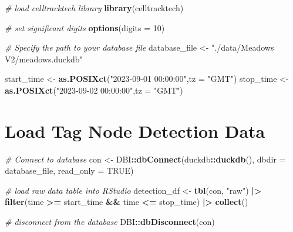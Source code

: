 \documentclass[
]{book}
\newenvironment{Shaded}{\begin{snugshade}}{\end{snugshade}}
\newcommand{\AttributeTok}[1]{\textcolor[rgb]{0.13,0.29,0.53}{#1}}
\newcommand{\CommentTok}[1]{\textcolor[rgb]{0.56,0.35,0.01}{\textit{#1}}}
\newcommand{\ConstantTok}[1]{\textcolor[rgb]{0.56,0.35,0.01}{#1}}
\newcommand{\DecValTok}[1]{\textcolor[rgb]{0.00,0.00,0.81}{#1}}
\newcommand{\FunctionTok}[1]{\textcolor[rgb]{0.13,0.29,0.53}{\textbf{#1}}}
\newcommand{\NormalTok}[1]{#1}
\newcommand{\OtherTok}[1]{\textcolor[rgb]{0.56,0.35,0.01}{#1}}
\newcommand{\SpecialCharTok}[1]{\textcolor[rgb]{0.81,0.36,0.00}{\textbf{#1}}}
\newcommand{\StringTok}[1]{\textcolor[rgb]{0.31,0.60,0.02}{#1}}
\begin{document}
\begin{Shaded}
\begin{Highlighting}[]
\CommentTok{\# load celltracktech library}
\FunctionTok{library}\NormalTok{(celltracktech)}

\CommentTok{\# set significant digits}
\FunctionTok{options}\NormalTok{(}\AttributeTok{digits =} \DecValTok{10}\NormalTok{)}

\CommentTok{\# Specify the path to your database file}
\NormalTok{database\_file }\OtherTok{\textless{}{-}} \StringTok{"./data/Meadows V2/meadows.duckdb"}

\NormalTok{start\_time }\OtherTok{\textless{}{-}} \FunctionTok{as.POSIXct}\NormalTok{(}\StringTok{"2023{-}09{-}01 00:00:00"}\NormalTok{,}\AttributeTok{tz =} \StringTok{"GMT"}\NormalTok{)}
\NormalTok{stop\_time }\OtherTok{\textless{}{-}} \FunctionTok{as.POSIXct}\NormalTok{(}\StringTok{"2023{-}09{-}02 00:00:00"}\NormalTok{,}\AttributeTok{tz =} \StringTok{"GMT"}\NormalTok{)}
\end{Highlighting}
\end{Shaded}

\section{Load Tag Node Detection Data}\label{load-tag-node-detection-data}

\begin{Shaded}
\begin{Highlighting}[]
\CommentTok{\# Connect to database}
\NormalTok{con }\OtherTok{\textless{}{-}}\NormalTok{ DBI}\SpecialCharTok{::}\FunctionTok{dbConnect}\NormalTok{(duckdb}\SpecialCharTok{::}\FunctionTok{duckdb}\NormalTok{(), }
                      \AttributeTok{dbdir =}\NormalTok{ database\_file, }
                      \AttributeTok{read\_only =} \ConstantTok{TRUE}\NormalTok{)}

\CommentTok{\# load raw data table into RStudio}
\NormalTok{detection\_df }\OtherTok{\textless{}{-}} \FunctionTok{tbl}\NormalTok{(con, }\StringTok{"raw"}\NormalTok{) }\SpecialCharTok{|\textgreater{}} 
  \FunctionTok{filter}\NormalTok{(time }\SpecialCharTok{\textgreater{}=}\NormalTok{ start\_time }\SpecialCharTok{\&\&}\NormalTok{ time }\SpecialCharTok{\textless{}=}\NormalTok{ stop\_time) }\SpecialCharTok{|\textgreater{}}
  \FunctionTok{collect}\NormalTok{()}

\CommentTok{\# disconnect from the database}
\NormalTok{DBI}\SpecialCharTok{::}\FunctionTok{dbDisconnect}\NormalTok{(con)}
\end{Highlighting}
\end{Shaded}
\end{document}
